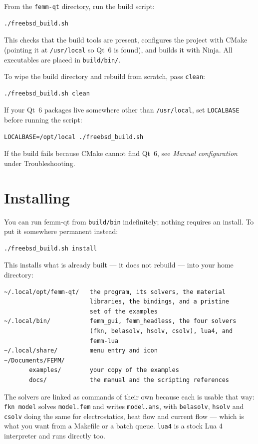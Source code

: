 \documentclass[11pt]{article}
\begin{document}
From the \texttt{femm-qt} directory, run the build script:
\begin{lstlisting}
./freebsd_build.sh
\end{lstlisting}

This checks that the build tools are present, configures the project with
CMake (pointing it at \texttt{/usr/local} so Qt~6 is found), and builds it
with Ninja.  All executables are placed in \texttt{build/bin/}.

To wipe the build directory and rebuild from scratch, pass \texttt{clean}:
\begin{lstlisting}
./freebsd_build.sh clean
\end{lstlisting}

If your Qt~6 packages live somewhere other than \texttt{/usr/local}, set
\texttt{LOCALBASE} before running the script:
\begin{lstlisting}
LOCALBASE=/opt/local ./freebsd_build.sh
\end{lstlisting}

If the build fails because CMake cannot find Qt~6, see \textit{Manual
configuration} under Troubleshooting.

\section{Installing}

You can run femm-qt from \texttt{build/bin} indefinitely; nothing requires
an install.  To put it somewhere permanent instead:
\begin{lstlisting}
./freebsd_build.sh install
\end{lstlisting}

This installs what is already built --- it does not rebuild --- into your
home directory:
\begin{lstlisting}
~/.local/opt/femm-qt/   the program, its solvers, the material
                        libraries, the bindings, and a pristine
                        set of the examples
~/.local/bin/           femm_gui, femm_headless, the four solvers
                        (fkn, belasolv, hsolv, csolv), lua4, and
                        femm-lua
~/.local/share/         menu entry and icon
~/Documents/FEMM/
       examples/        your copy of the examples
       docs/            the manual and the scripting references
\end{lstlisting}

The solvers are linked as commands of their own because each is usable
that way: \texttt{fkn model} solves \texttt{model.fem} and writes
\texttt{model.ans}, with \texttt{belasolv}, \texttt{hsolv} and
\texttt{csolv} doing the same for electrostatics, heat flow and current
flow --- which is what you want from a Makefile or a batch queue.
\texttt{lua4} is a stock Lua 4 interpreter and runs directly too.
\end{document}
